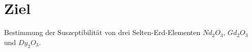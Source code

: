 \section{Ziel}
\label{sec:ziel}

Bestimmung der Suszeptibilität von drei Selten-Erd-Elementen $Nd_2O_3$, $Gd_2O_3$ und $Dy_2O_3$.
